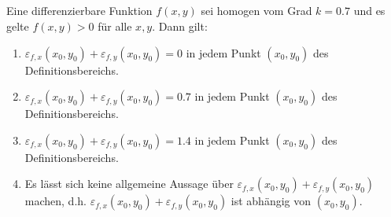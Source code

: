 \subsection*{}
Eine differenzierbare Funktion $f(x,y)$ sei homogen vom Grad $k = 0.7$ und es gelte $f(x,y) > 0$ für alle $x,y$.
Dann gilt:
\renewcommand{\labelenumi}{(\alph{enumi})}
\begin{enumerate}
\item $\varepsilon_{f,x}(x_0,y_0) + \varepsilon_{f,y}(x_0,y_0) = 0$ in jedem Punkt $(x_0,y_0)$ des Definitionsbereichs.
\item $\varepsilon_{f,x}(x_0,y_0) + \varepsilon_{f,y}(x_0,y_0) = 0.7$ in jedem Punkt $(x_0,y_0)$ des Definitionsbereichs.
\item $\varepsilon_{f,x}(x_0,y_0) + \varepsilon_{f,y}(x_0,y_0) = 1.4$ in jedem Punkt $(x_0,y_0)$ des Definitionsbereichs.
\item Es lässt sich keine allgemeine Aussage über $\varepsilon_{f,x}(x_0,y_0) + \varepsilon_{f,y}(x_0,y_0)$ machen,
d.h. $\varepsilon_{f,x}(x_0,y_0) + \varepsilon_{f,y}(x_0,y_0)$ ist abhängig von $(x_0,y_0)$.
\end{enumerate}